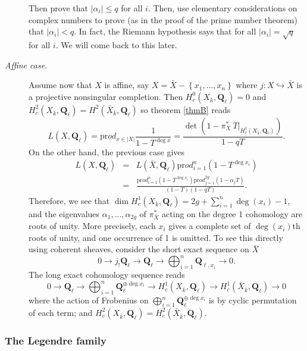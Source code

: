 \begin{description}
Then prove that $|\alpha_i| \leq q$ for all $i$. Then, use elementary considerations on complex numbers to prove (as in the proof of the prime number theorem) that $|\alpha_i| < q$. In fact, the Riemann hypothesis says that for all $|\alpha_i| = \sqrt q$ for all $i$. We will come back to this later.

\item[\it Affine case.] 
Assume now that $X$ is affine, say $X= \bar X-\left\{x_1, \ldots, x_n\right\}$ where $j: X \hookrightarrow \bar X$ is a projective nonsingular completion. Then $H_c^0(X_{\bar k}, \mathbf{Q}_\ell) = 0$ and $H_c^2(X_{\bar k}, \mathbf{Q}_\ell) = H^2(\bar X_{\bar k}, \mathbf{Q}_\ell)$ so theorem \ref{thmB} reads
$$
L(X, \mathbf{Q}_\ell)  =  \text{pr}od_{x\in |X|}\frac{1}{1-T^{\deg x}} = \frac{\det\left(1-\pi_X^*\ T\big|_{H_c^1(X_{\bar k}, \mathbf{Q}_\ell)}\right)}{1-qT}.
$$
On the other hand, the previous case gives
\begin{eqnarray*}
L(X, \mathbf{Q}_\ell) & = & L(\bar X, \mathbf{Q}_\ell)\text{pr}od_{i=1}^n\left(1-T^{\deg x_i}\right) \\
& = & \frac{\text{pr}od_{i=1}^n(1-T^{\deg x_i})\text{pr}od_{j=1}^{2g}(1-\alpha_jT)}{(1-T)(1-qT)}.
\end{eqnarray*}
Therefore, we see that $\dim H_c^1(X_{\bar k}, \mathbf{Q}_\ell) = 2g+\sum_{i=1}^n \deg(x_i)-1$, and the eigenvalues $\alpha_1, \ldots, \alpha_{2g}$ of $\pi_{\bar X}^*$ acting on the degree 1 cohomology are roots of unity. More precisely, each $x_i$ gives a complete set of $\deg(x_i)$th roots of unity, and one occurrence of 1 is omitted.  To see this directly using coherent sheaves, consider the short exact sequence on $\bar X$
$$
0\to j_!\mathbf{Q}_\ell\to \mathbf{Q}_\ell\to\bigoplus_{i=1}^n \mathbf{Q}_{\ell, x_i}\to 0.
$$
The long exact cohomology sequence reads
$$
0\to \mathbf{Q}_\ell \to \bigoplus_{i=1}^n \mathbf{Q}_\ell^{\oplus \deg x_i} \to H_c^1(X_{\bar k}, \mathbf{Q}_\ell) \to H_c^1(\bar X_{\bar k}, \mathbf{Q}_\ell)\to 0
$$
where the action of Frobenius on $\bigoplus_{i=1}^n \mathbf{Q}_\ell^{\oplus \deg x_i}$ is by cyclic permutation of each term; and $H_c^2(X_{\bar k}, \mathbf{Q}_\ell) = H_c^2(\bar X_{\bar k}, \mathbf{Q}_\ell)$.
\end{description}

\subsubsection*{The Legendre family}

